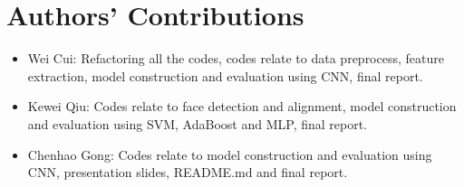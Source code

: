 \documentclass[10pt,twocolumn,letterpaper]{article}
\begin{document}
\section{Authors’ Contributions}
\begin{itemize}
    \item Wei Cui: Refactoring all the codes, codes relate to data preprocess, feature extraction, model construction and evaluation using CNN, final report.
    \item Kewei Qiu: Codes relate to face detection and alignment, model construction and evaluation using SVM, AdaBoost and MLP, final report.
    \item Chenhao Gong: Codes relate to model construction and evaluation using CNN, presentation slides, README.md and final report.
\end{itemize}

{\small


}
\end{document}
